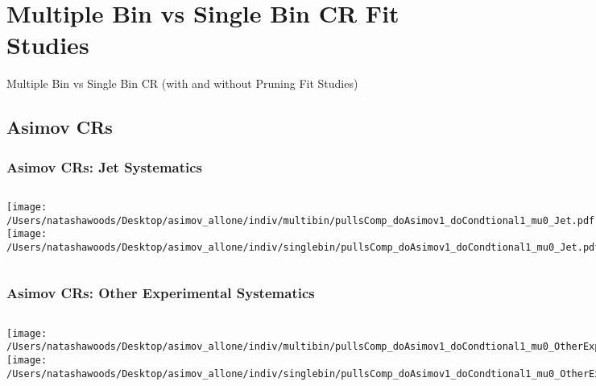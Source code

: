 \documentclass{beamer}
\begin{document}
\section{Multiple Bin vs Single Bin CR Fit Studies} %
\begin{frame}
Multiple Bin vs Single Bin CR (with and without Pruning Fit Studies)
\end{frame}
\subsection{Asimov CRs} %
\begin{frame}
\frametitle{Asimov CRs: Jet Systematics}
    \begin{columns}[t]
       \texttt{[image: /Users/natashawoods/Desktop/asimov\_allone/indiv/multibin/pullsComp\_doAsimov1\_doCondtional1\_mu0\_Jet.pdf]}
              \texttt{[image: /Users/natashawoods/Desktop/asimov\_allone/indiv/singlebin/pullsComp\_doAsimov1\_doCondtional1\_mu0\_Jet.pdf]}
       \end{columns}
\end{frame}

\begin{frame}
\frametitle{Asimov CRs: Other Experimental Systematics}
    \begin{columns}[t]
       \texttt{[image: /Users/natashawoods/Desktop/asimov\_allone/indiv/multibin/pullsComp\_doAsimov1\_doCondtional1\_mu0\_OtherExp.pdf]}
              \texttt{[image: /Users/natashawoods/Desktop/asimov\_allone/indiv/singlebin/pullsComp\_doAsimov1\_doCondtional1\_mu0\_OtherExp.pdf]}
       \end{columns}
\end{frame}
\end{document}
